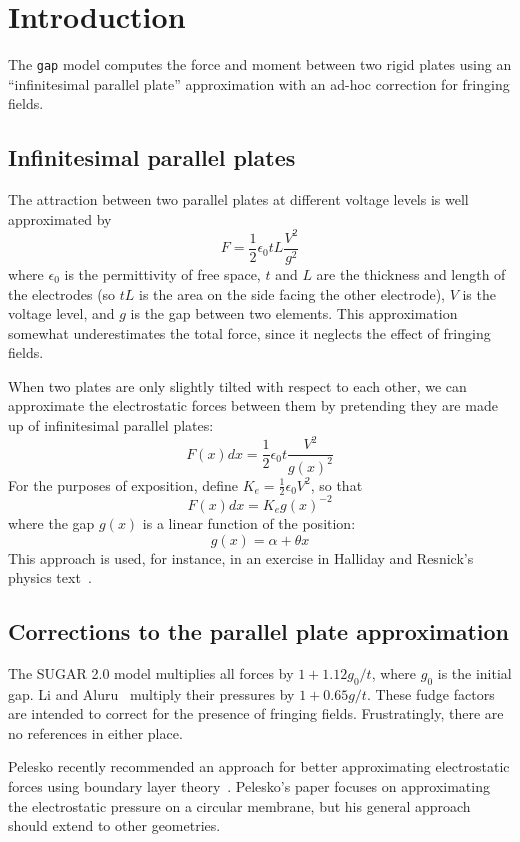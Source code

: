 
\section{Introduction}

The {\tt{}gap} model computes the force and moment between two
rigid plates using an ``infinitesimal parallel plate''
approximation with an ad-hoc correction for fringing fields.


\subsection{Infinitesimal parallel plates}

The attraction between two parallel plates at different voltage
levels is well approximated by
\[
  F = \frac{1}{2} \epsilon_0 tL \frac{V^2}{g^2}
\]
where $\epsilon_0$ is the permittivity of free space, $t$ and $L$
are the thickness and length of the electrodes (so $tL$ is the area
on the side facing the other electrode), $V$ is the voltage level,
and $g$ is the gap between two elements.  This approximation
somewhat underestimates the total force, since it neglects the effect of
fringing fields.

When two plates are only slightly tilted with respect to
each other, we can approximate the electrostatic forces between
them by pretending they are made up of infinitesimal parallel
plates:
\[
  F(x) dx = \frac{1}{2} \epsilon_0 t \frac{V^2}{g(x)^2}
\]
For the purposes of exposition, define 
$K_e = \frac{1}{2} \epsilon_0 V^2$, so that
\[
  F(x) dx = K_e g(x)^{-2}
\]
where the gap $g(x)$ is a linear function of the position:
\[
  g(x) = \alpha + \theta x
\]
This approach is used, for instance, in an exercise in Halliday
and Resnick's physics text~\cite{HallResn62b}.

\subsection{Corrections to the parallel plate approximation}

The SUGAR 2.0 model multiplies all forces by $1 + 1.12 g_0 / t$,
where $g_0$ is the initial gap.  Li and Aluru~\cite{LiAlur01} 
multiply their pressures by $1 + 0.65 g / t$.  
These fudge factors are intended to correct for the presence 
of fringing fields.  Frustratingly, there are no references in 
either place.

Pelesko recently recommended an approach for better approximating
electrostatic forces using boundary layer theory~\cite{Peles01}.
Pelesko's paper focuses on approximating the electrostatic pressure 
on a circular membrane, but his general approach should extend to 
other geometries.


